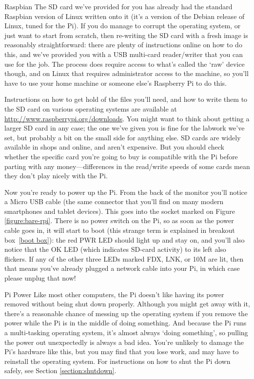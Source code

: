 \begin{rpi}{Raspbian}
  The SD card we've provided for you has already had the standard Raspbian version of Linux written onto it (it's a version of the Debian release of Linux, tuned for the Pi). If you do manage to corrupt the operating system, or just want to start from scratch, then re-writing the SD card with a fresh image is reasonably straightforward: there are plenty of instructions online on how to do this, and we've provided you with a USB multi-card reader/writer that you can use for the job. The process does require access to what's called the `raw' device though, and on Linux that requires administrator access to the machine, so you'll have to use your home machine or someone else's Raspberry Pi to do this.

  Instructions on how to get hold of the files you'll need, and how to write them to the SD card on various operating systems are available at \url{http://www.raspberrypi.org/downloads}. You might want to think about getting a larger SD card in any case; the one we've given you is fine for the labwork we've set, but probably a bit on the small side for anything else. SD cards are widely available in shops and online, and aren't expensive. But you should check whether the specific card you're going to buy is compatible with the Pi before parting with any money---differences in the read/write speeds of some cards mean they don't play nicely with the Pi.
\end{rpi}

Now you're ready to power up the Pi. From the back of the monitor you'll notice a Micro USB cable (the same connector that you'll find on many modern smartphones and tablet devices). This goes into the socket marked  on Figure \ref{figure:bare-rpi}. There is no power switch on the Pi, so as soon as the power cable goes in, it will start to boot (this strange term is explained in breakout box~\ref{boot box}): the red PWR LED should light up and stay on, and you'll also notice that the OK LED (which indicates SD-card activity) to its left also flickers. If any of the other three LEDs marked FDX, LNK, or 10M are lit, then that means you've already plugged a network cable into your Pi, in which case please unplug that now!

\begin{danger}{Pi Power} 
Like most other computers, the Pi doesn't like having its power removed without being shut down properly. Although you might get away with it, there's a reasonable chance of messing up the operating system if you remove the power while the Pi is in the middle of doing something. And because the Pi runs a multi-tasking operating system, it's almost always `doing something', so pulling the power out unexpectedly is always a bad idea. You're unlikely to damage the Pi's hardware like this, but you may find that you lose work, and may have to reinstall the operating system. For instructions on how to shut the Pi down safely, see Section \ref{section:shutdown}.
\end{danger}

